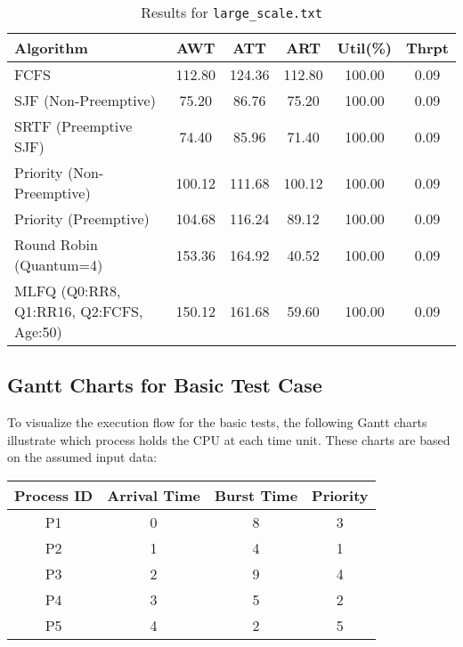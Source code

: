 \documentclass[12pt]{article}
\begin{document}
\begin{table}[htbp]
\centering
\caption{Results for \texttt{large\_scale.txt}}
\label{tab:large_results}
\footnotesize
\begin{tabular}{@{}l S[table-format=3.2] S[table-format=3.2] S[table-format=3.2] S[table-format=3.2] S[table-format=1.2]@{}}
\toprule
Algorithm                                     & {AWT} & {ATT} & {ART} & {Util(\%)} & {Thrpt}\\
\midrule
FCFS                                         & 112.80        & 124.36           & 112.80         & 100.00          & 0.09 \\
SJF (Non-Preemptive)                         & 75.20         & 86.76            & 75.20          & 100.00          & 0.09 \\
SRTF (Preemptive SJF)                        & 74.40         & 85.96            & 71.40          & 100.00          & 0.09 \\
Priority (Non-Preemptive)                    & 100.12        & 111.68           & 100.12         & 100.00          & 0.09 \\
Priority (Preemptive)                        & 104.68        & 116.24           & 89.12          & 100.00          & 0.09 \\
Round Robin (Quantum=4)                      & 153.36        & 164.92           & 40.52          & 100.00          & 0.09 \\
MLFQ (Q0:RR8, Q1:RR16, Q2:FCFS, Age:50)      & 150.12        & 161.68           & 59.60          & 100.00          & 0.09 \\
\bottomrule
\end{tabular}
\end{table}

\newpage
\subsection{Gantt Charts for Basic Test Case}

To visualize the execution flow for the basic tests, the following Gantt charts illustrate which process holds the CPU at each time unit. These charts are based on the assumed input data:

\begin{center}
\begin{tabular}{cccc}
\toprule
Process ID & Arrival Time & Burst Time & Priority \\
\midrule
 P1         & 0            & 8          & 3        \\
 P2         & 1            & 4          & 1        \\
 P3         & 2            & 9          & 4        \\
 P4         & 3            & 5          & 2        \\
 P5         & 4            & 2          & 5        \\
\bottomrule
\end{tabular}
\end{center}
\end{document}
